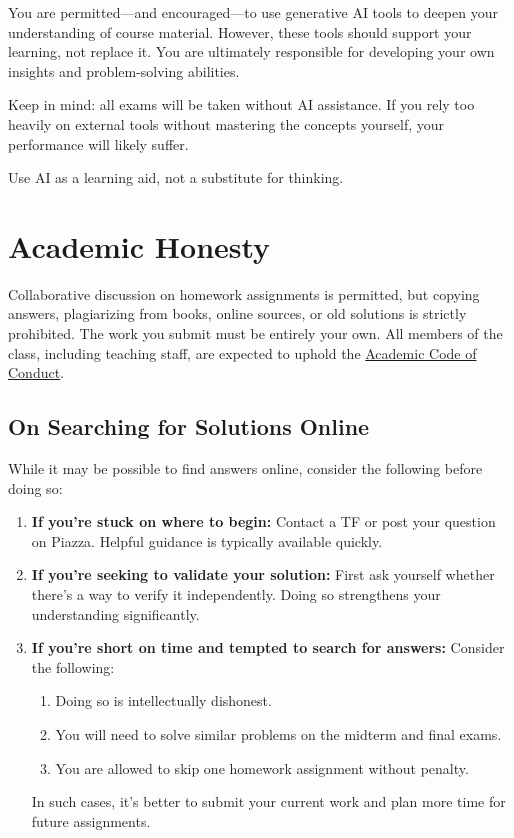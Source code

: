 \documentclass[11pt]{article}
\begin{document}
You are permitted—and encouraged—to use generative AI tools to deepen your understanding of course material. However, these tools should support your learning, not replace it. You are ultimately responsible for developing your own insights and problem-solving abilities.

Keep in mind: all exams will be taken without AI assistance. If you rely too heavily on external tools without mastering the concepts yourself, your performance will likely suffer.

Use AI as a learning aid, not a substitute for thinking.

\section*{Academic Honesty}

Collaborative discussion on homework assignments  is permitted, but copying answers, plagiarizing from books, online sources, or old solutions is strictly prohibited. The work you submit must be entirely your own. All members of the class, including teaching staff, are expected to uphold the 
\href{http://www.bu.edu/dos/policies/student-responsibilities/}{Academic Code of Conduct}.

\subsection*{On Searching for Solutions Online}

While it may be possible to find answers online, consider the following before doing so:

\begin{enumerate}
    \item \textbf{If you're stuck on where to begin:} 
    Contact a TF or post your question on Piazza. Helpful guidance is typically available quickly.

    \item \textbf{If you're seeking to validate your solution:}
    First ask yourself whether there's a way to verify it independently. Doing so strengthens your understanding significantly.

    \item \textbf{If you're short on time and tempted to search for answers:}
    Consider the following:
    \begin{enumerate}
        \item Doing so is intellectually dishonest.
        \item You will need to solve similar problems on the midterm and final exams.
        \item You are allowed to skip one homework assignment without penalty.
    \end{enumerate}
    In such cases, it's better to submit your current work and plan more time for future assignments.
\end{enumerate}
\end{document}

